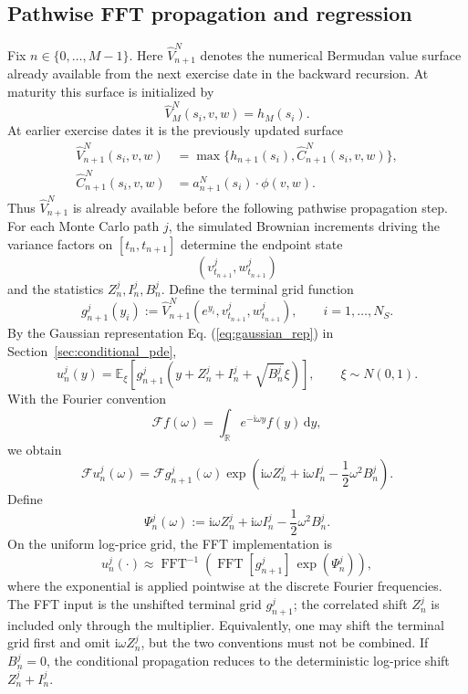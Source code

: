 \documentclass[pdflatex,sn-mathphys-num]{sn-jnl}
\theoremstyle{thmstyleone}%
\theoremstyle{thmstylethree}%
\theoremstyle{thmstyletwo}%
\newcommand{\dd}{\mathrm d}
\newcommand{\E}{\mathbb E}
\newcommand{\R}{\mathbb R}
\begin{document}
\subsection{Pathwise FFT propagation and regression}
Fix $n\in\{0,\ldots,M-1\}$. Here $\widehat V_{n+1}^N$ denotes the numerical
Bermudan value surface already available from the next exercise date in the
backward recursion. At maturity this surface is initialized by
$$
\widehat V_M^N(s_i,v,w)=h_M(s_i).
$$
At earlier exercise dates it is the previously updated surface
$$
\begin{aligned}
\widehat V_{n+1}^N(s_i,v,w)
&=
\max\{h_{n+1}(s_i),\widehat C_{n+1}^N(s_i,v,w)\},\\
\widehat C_{n+1}^N(s_i,v,w)
&=
a_{n+1}^N(s_i)\cdot\phi(v,w).
\end{aligned}
$$
Thus $\widehat V_{n+1}^N$ is already available before the following pathwise
propagation step. For each Monte Carlo path $j$, the simulated Brownian
increments driving the variance factors on $[t_n,t_{n+1}]$ determine the
endpoint state
$$
(v_{t_{n+1}}^j,w_{t_{n+1}}^j)
$$
and the statistics $Z_n^j,I_n^j,B_n^j$. Define the terminal grid function
$$
g_{n+1}^j(y_i)
:=
\widehat V_{n+1}^N
\left(e^{y_i},v_{t_{n+1}}^j,w_{t_{n+1}}^j\right),
\qquad i=1,\ldots,N_S.
$$
By the Gaussian representation Eq. (\ref{eq:gaussian_rep}) in Section~\ref{sec:conditional_pde},
$$
u_n^j(y)
=
\E_\xi\!\left[
g_{n+1}^j
\left(
y+Z_n^j+I_n^j+\sqrt{B_n^j}\xi
\right)
\right],
\qquad \xi\sim N(0,1).
$$
With the Fourier convention
$$
\mathcal F f(\omega)
=
\int_{\R}e^{-\mathrm i\omega y}f(y)\,\dd y,
$$
we obtain
$$
\mathcal F u_n^j(\omega)
=
\mathcal F g_{n+1}^j(\omega)
\exp\left(
\mathrm i\omega Z_n^j+\mathrm i\omega I_n^j-\frac12\omega^2B_n^j
\right).
$$
Define
$$
\Psi_n^j(\omega)
:=
\mathrm i\omega Z_n^j+\mathrm i\omega I_n^j-\frac12\omega^2B_n^j.
$$
On the uniform log-price grid, the FFT implementation is
\begin{equation}
u_n^j(\cdot)
\approx
\operatorname{FFT}^{-1}
\left(
\operatorname{FFT}[g_{n+1}^j]\,
\exp(\Psi_n^j)
\right),
\label{eq:fft-recursion}
\end{equation}
where the exponential is applied pointwise at the discrete Fourier frequencies.
The FFT input is the unshifted terminal grid $g_{n+1}^j$; the correlated shift
$Z_n^j$ is included only through the multiplier. Equivalently, one may shift the
terminal grid first and omit $\mathrm i\omega Z_n^j$, but the two conventions
must not be combined. If $B_n^j=0$, the conditional propagation reduces to the
deterministic log-price shift $Z_n^j+I_n^j$.
\end{document}

